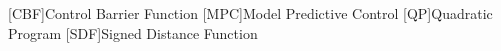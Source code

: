 [CBF]{Control Barrier Function}
[MPC]{Model Predictive Control}
[QP]{Quadratic Program}
[SDF]{Signed Distance Function}